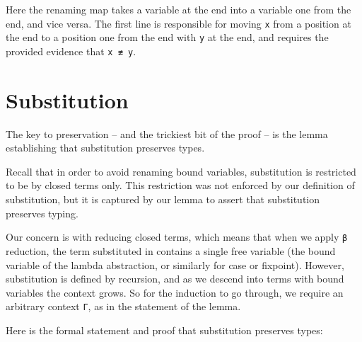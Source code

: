 Here the renaming map takes a variable at the end into a variable one
from the end, and vice versa. The first line is responsible for moving
\texttt{x} from a position at the end to a position one from the end
with \texttt{y} at the end, and requires the provided evidence that
\texttt{x\ ≢\ y}.

\hypertarget{substitution}{%
\section{Substitution}\label{substitution}}

The key to preservation -- and the trickiest bit of the proof -- is the
lemma establishing that substitution preserves types.

Recall that in order to avoid renaming bound variables, substitution is
restricted to be by closed terms only. This restriction was not enforced
by our definition of substitution, but it is captured by our lemma to
assert that substitution preserves typing.

Our concern is with reducing closed terms, which means that when we
apply \texttt{β} reduction, the term substituted in contains a single
free variable (the bound variable of the lambda abstraction, or
similarly for case or fixpoint). However, substitution is defined by
recursion, and as we descend into terms with bound variables the context
grows. So for the induction to go through, we require an arbitrary
context \texttt{Γ}, as in the statement of the lemma.

Here is the formal statement and proof that substitution preserves
types:

